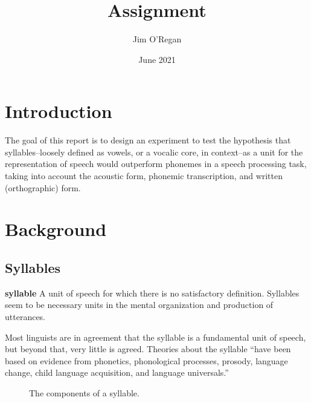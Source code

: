 \documentclass{article}[11pt]
\title{Assignment}
\author{Jim O'Regan}
\date{June 2021}
\begin{document}
\maketitle

\section{Introduction}
\label{sect:intro}

The goal of this report is to design an experiment to test the hypothesis that syllables--loosely defined as vowels, or a vocalic core, in context--as a unit for the representation of speech would outperform phonemes in a speech processing task, taking into account the acoustic form, phonemic transcription, and written (orthographic) form.

\section{Background}
\label{sect:bg}

\subsection{Syllables}
\label{ssect:syllables}

\begin{displayquote}
\textbf{syllable} A unit of speech for which there is
no satisfactory definition. Syllables seem to
be necessary units in the mental organization and production of utterances.~\citep{ladefoged_course_2011}
\end{displayquote}

Most linguists are in agreement that the syllable is a fundamental unit of speech, but beyond that, very little is agreed. Theories about the syllable ``have been based on evidence from phonetics, phonological processes, prosody, language change, child language acquisition, and language universals.''~\citep{fallows_experimental_1981}

\begin{figure}[!h]
\caption{The components of a syllable.}
\label{fig:syll}
\centering
{}
\end{figure}
\end{document}
